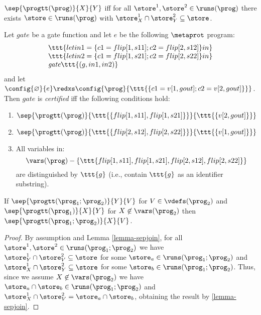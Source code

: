 \begin{lemma}
  \label{lemma-sepjoin}
  $\sep{\progtt(\prog)}{X}{Y}$ iff for all 
  $\store^1, \store^2 \in \runs(\prog)$ there exists
  $\store \in \runs(\prog)$ with
  $\store^1_{X} \cap \store^2_{Y} \subseteq \store$.
\end{lemma}


\begin{definition}
  \label{definition-gmwgate-certification}
  Let $\mathit{gate}$ be a gate function and let $e$ be the following
  $\metaprot$ program:
  $$
  \begin{array}{l}
    \ttt{let in1 = \{c1 = flip[1,s11];c2 = flip[2,s12]\} in}\\
    \ttt{let in2 = \{c1 = flip[1,s21];c2 = flip[2,s22]\} in}\\
    \mathit{gate}\ttt{(g,in1,in2)}
  \end{array}
  $$
  and let $
  \config{\varnothing}{e}\redxs\config{\prog}{\ttt{\{c1 = v[1,gout]; c2 = v[2,gout]\}}}
  $.
  Then $\mathit{gate}$ is \emph{certified} iff the following conditions hold:
  \begin{enumerate}[\hspace{5mm}i.]
  \item $\sep{\progtt(\prog)}{\ttt{\{flip[1,s11],flip[1,s21]\}}}{\ttt{\{v[2,gout]\}}}$
  \item $\sep{\progtt(\prog)}{\ttt{\{flip[2,s12],flip[2,s22]\}}}{\ttt{\{v[1,gout]\}}}$
  \item All variables in:$$\vars(\prog) - \{ \ttt{flip[1,s11],flip[1,s21],flip[2,s12],flip[2,s22]}\}$$
    are distinguished by $\ttt{g}$ (i.e., contain $\ttt{g}$ as an identifier substring). 
  \end{enumerate}
\end{definition}

\begin{lemma}
  \label{lemma-gmw-frame}
  If $\sep{\progtt(\prog_1;\prog_2)}{Y}{V}$ for $V \in \vdefs(\prog_2)$ and $\sep{\progtt(\prog_1)}{X}{Y}$ for
  $X \not\in \vars(\prog_2)$ then $\sep{\progtt(\prog_1;\prog_2)}{X}{V}$. 
\end{lemma}
\begin{proof}
  By assumption and Lemma \ref{lemma-sepjoin}, for all
  $\store^1,\store^2 \in \runs(\prog_1;\prog_2)$ we have $\store^1_Y
  \cap \store^2_V \subseteq \store$ for some $\store_a \in
  \runs(\prog_1;\prog_2)$ and $\store^1_X \cap \store^2_Y \subseteq
  \store$ for some $\store_b \in \runs(\prog_1;\prog_2)$.  Thus, since
  we assume $X \not\in \vars(\prog_2)$ we have $\store_a \cap \store_b
  \in \runs(\prog_1;\prog_2)$ and $\store^1_X \cap \store^2_V =
  \store_a \cap \store_b$, obtaining the result by
  \ref{lemma-sepjoin}.
\end{proof}


